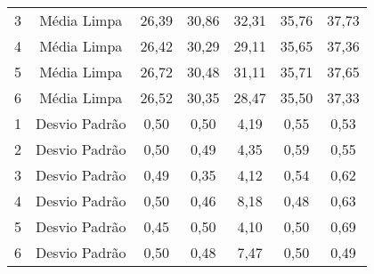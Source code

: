 \begin{table}[]
\begin{tabular}{|c|c|ccccc|}
3                         & Média Limpa                                                                & 26,39                     & 30,86                     & 32,31                     & 35,76                     & 37,73                      \\
4                         & Média Limpa                                                                & 26,42                     & 30,29                     & 29,11                     & 35,65                     & 37,36                      \\
5                         & Média Limpa                                                                & 26,72                     & 30,48                     & 31,11                     & 35,71                     & 37,65                      \\
6                         & Média Limpa                                                                & 26,52                     & 30,35                     & 28,47                     & 35,50                     & 37,33                      \\ \hline
1                         & Desvio Padrão                                                              & 0,50                      & 0,50                      & 4,19                      & 0,55                      & 0,53                       \\
2                         & Desvio Padrão                                                              & 0,50                      & 0,49                      & 4,35                      & 0,59                      & 0,55                       \\
3                         & Desvio Padrão                                                              & 0,49                      & 0,35                      & 4,12                      & 0,54                      & 0,62                       \\
4                         & Desvio Padrão                                                              & 0,50                      & 0,46                      & 8,18                      & 0,48                      & 0,63                       \\
5                         & Desvio Padrão                                                              & 0,45                      & 0,50                      & 4,10                      & 0,50                      & 0,69                       \\
6                         & Desvio Padrão                                                              & 0,50                      & 0,48                      & 7,47                      & 0,50                      & 0,49                       \\ \hline

\end{tabular}
\end{table}
